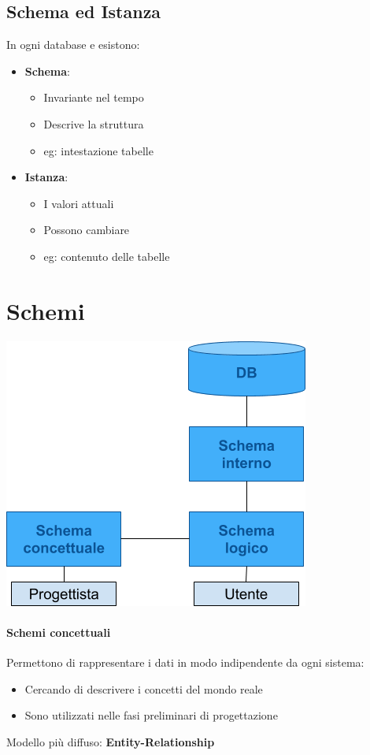 \documentclass[12pt,a4paper]{article}
\begin{document}
\subsection{Schema ed Istanza}
In ogni database e esistono:
\begin{itemize}
\item \textbf{Schema}:
\begin{itemize}
\item Invariante nel tempo
\item Descrive la struttura
\item eg: intestazione tabelle
\end{itemize}
\item \textbf{Istanza}:
\begin{itemize}
\item I valori attuali
\item Possono cambiare
\item eg: contenuto delle tabelle
\end{itemize}
\end{itemize}

\clearpage
\section{Schemi}
\begin{center}
\includegraphics[width=0.6\columnwidth]{img/schemi.png}
\end{center}
\paragraph{Schemi concettuali}
Permettono di rappresentare i dati in modo indipendente da ogni sistema:
\begin{itemize}
\item Cercando di descrivere i concetti del mondo reale
\item Sono utilizzati nelle fasi preliminari di progettazione
\end{itemize}
Modello più diffuso: \textbf{Entity-Relationship}
\end{document}
